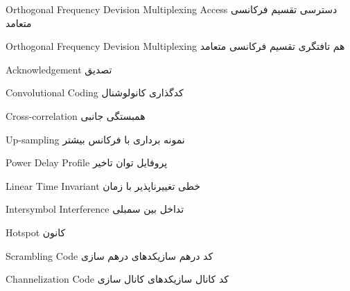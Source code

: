 {Orthogonal Frequency Devision Multiplexing Access}
{دسترسی تقسیم فرکانسی متعامد}{}





{Orthogonal Frequency Devision Multiplexing}
{هم تافتگری تقسیم فرکانسی متعامد}{}


{Acknowledgement}
{تصدیق}{}



{Convolutional Coding}
{کدگذاری کانولوشنال}{}


{Cross-correlation} 
{همبستگی جانبی}{}

{Up-sampling} 
{نمونه برداری با فرکانس بیشتر}{}



{Power Delay Profile} 
{پروفایل توان تاخیر}{}


{Linear Time Invariant}
	{خطی تغییرناپذیر با زمان}{}


{Intersymbol Interference}
{تداخل بین سمبلی}{}







{Hotspot}
{کانون}{}






{Scrambling Code} 
{کد درهم سازی}{کدهای درهم سازی}


{Channelization Code} 
{کد کانال سازی}{کدهای کانال سازی}


	
